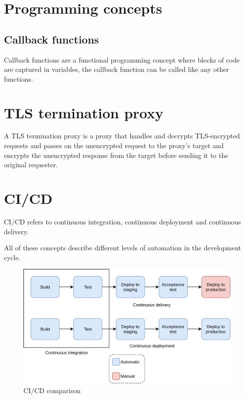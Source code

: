 \section{Programming concepts}

\subsection{Callback functions}
Callback functions are a functional programming concept where blocks of code are captured in variables, the callback function can be called like any other functions. 


\section{TLS termination proxy}
A TLS termination proxy is a proxy that handles and decrypts TLS-encrypted requests and passes on the unencrypted request to the proxy's target and encrypts the unencrypted response from the target before sending it to the original requester.

\section{CI/CD}
CI/CD refers to continuous integration, continuous deployment and continuous delivery.

All of these concepts describe different levels of automation in the development cycle.


\begin{figure}[h!]
  \includegraphics[width=\textwidth,height=\textheight,keepaspectratio]{images/ci_cd_comparison.png}
  \caption{CI/CD comparison}
\label{fig:CI/CD-comparison}
\end{figure}

